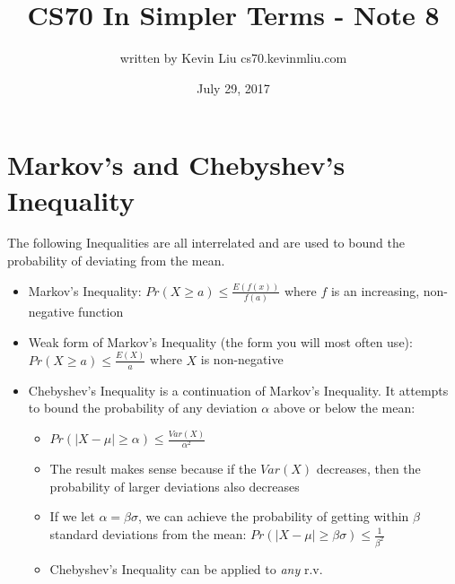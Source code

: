 \documentclass[a4paper]{article}
\title{CS70 In Simpler Terms - Note 8}
\author{written by Kevin Liu cs70.kevinmliu.com}
\date{July 29, 2017}
\begin{document}
\maketitle

\section{Markov's and Chebyshev's Inequality}
The following Inequalities are all interrelated and are used to bound the probability of deviating from the mean.
\begin{itemize}
    \item Markov's Inequality: $Pr(X\geq a) \leq \frac{E(f(x))}{f(a)}$ where $f$ is an increasing, non-negative function
    \item Weak form of Markov's Inequality (the form you will most often use): $Pr(X\geq a) \leq \frac{E(X)}{a}$ where $X$ is non-negative
    \item Chebyshev's Inequality is a continuation of Markov's Inequality. It attempts to bound the probability of any deviation $\alpha$ above or below the mean:
    \begin{itemize}
        \item $Pr(|X-\mu| \geq \alpha) \leq \frac{Var(X)}{\alpha^2}$
        \item The result makes sense because if the $Var(X)$ decreases, then the probability of larger deviations also decreases
        \item If we let $\alpha  = \beta \sigma$, we can achieve the probability of getting within $\beta$ standard deviations from the mean: $Pr(|X-\mu| \geq \beta \sigma) \leq \frac{1}{\beta^2}$
        \item Chebyshev's Inequality can be applied to \textit{any} r.v.
     \end{itemize}
\end{itemize}
\end{document}
